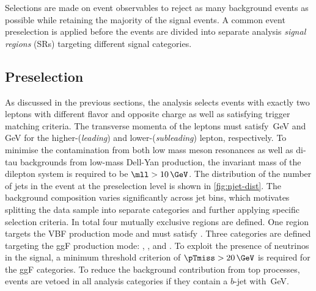 




Selections are made on event observables to reject as many background events as possible while retaining the majority of the signal events.
A common event preselection is applied before the events are divided into separate analysis \emph{signal regions} (SRs) targeting different signal categories.

\subsection{Preselection}
\label{subsec:preselection}
As discussed in the previous sections, the analysis selects events with exactly two leptons with different flavor and opposite charge as well as satisfying trigger matching criteria.
The transverse momenta of the leptons must satisfy \,GeV and \,GeV for the higher-\pT (\emph{leading}) and lower-\pT (\emph{subleading}) lepton, respectively.
To minimise the contamination from both low mass meson resonances as well as di-tau backgrounds from low-mass Dell-Yan production, the invariant mass of the dilepton system is required to be $\mll > 10\,\GeV$.
The distribution of the number of jets in the event at the preselection level is shown in \cref{fig:njet-dist}.
The background composition varies significantly across jet bins, which motivates splitting the data sample into separate \Njet categories and further applying specific selection criteria.
In total four mutually exclusive regions are defined.
One region targets the VBF production mode and must satisfy \TwoJet.
Three categories are defined targeting the ggF production mode: \ZeroJet, \OneJet, and \TwoJet.
To exploit the presence of neutrinos in the signal, a minimum threshold criterion of $\pTmiss > 20\,\GeV$ is required for the ggF categories.
To reduce the background contribution from top processes, events are vetoed in all analysis categories if they contain a $b$-jet with \,GeV.


